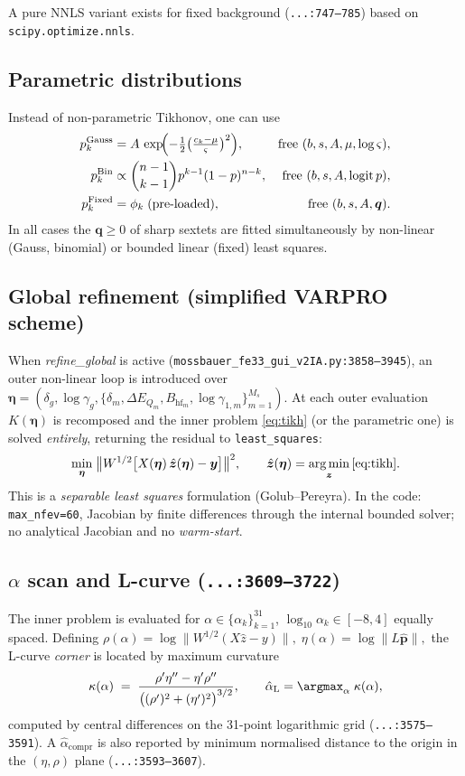 \documentclass[11pt,a4paper]{article}
\newcommand{\BHF}{B_{\mathrm{hf}}}
\newcommand{\dEQ}{\Delta E_{Q}}
\newcommand{\code}[1]{\texttt{\small #1}}
\newcommand{\file}[1]{\textcolor{black!70}{\texttt{\small #1}}}
\DeclareMathOperator*{\argmin}{arg\,min}
\begin{document}
A pure NNLS variant exists for fixed background (\file{...:747--785}) based on \code{scipy.optimize.nnls}.

\subsection{Parametric distributions}\label{sec:param}
Instead of non-parametric Tikhonov, one can use
\begin{align}
  p_k^{\text{Gauss}} &= A\,\exp\!\Bigl(-\tfrac12 \bigl(\tfrac{c_k-\mu}{\varsigma}\bigr)^{2}\Bigr), & \text{free } (b,s,A,\mu,\log\varsigma),\\
  p_k^{\text{Bin}} &\propto \binom{n-1}{k-1} p^{k-1}(1-p)^{n-k},& \text{free } (b,s,A,\text{logit}\,p),\\
  p_k^{\text{Fixed}} &= \phi_k\;\text{(pre-loaded)},& \text{free } (b,s,A,\bm q).
\end{align}
In all cases the $\bm q\ge0$ of sharp sextets are fitted simultaneously by non-linear (Gauss, binomial) or bounded linear (fixed) least squares.

\subsection{Global refinement (simplified VARPRO scheme)}
When \emph{refine\_global} is active (\file{mossbauer\_fe33\_gui\_v2IA.py:3858--3945}), an outer non-linear loop is introduced over $\bm\eta=(\delta_g,\log\gamma_g,\{\delta_m,\dEQ_m,\BHF_m,\log\gamma_{1,m}\}_{m=1}^{M_s})$. At each outer evaluation $K(\bm\eta)$ is recomposed and the inner problem \eqref{eq:tikh} (or the parametric one) is solved \emph{entirely}, returning the residual to \code{least\_squares}:
\begin{equation}
  \min_{\bm\eta}\;\bigl\|W^{1/2}\bigl[X(\bm\eta)\,\hat{\bm z}(\bm\eta) - \bm y\bigr]\bigr\|^{2},
  \qquad
  \hat{\bm z}(\bm\eta)=\argmin_{\bm z}\eqref{eq:tikh}.
  \label{eq:varpro}
\end{equation}
This is a \emph{separable least squares} formulation (Golub--Pereyra). In the code: \code{max\_nfev=60}, Jacobian by finite differences through the internal bounded solver; no analytical Jacobian and no \emph{warm-start}.

\subsection{$\alpha$ scan and L-curve (\file{...:3609--3722})}
The inner problem is evaluated for $\alpha\in\{\alpha_k\}_{k=1}^{31}$, $\log_{10}\alpha_k\in[-8,4]$ equally spaced. Defining
\(
  \rho(\alpha) = \log\|W^{1/2}(X\hat z - y)\|,\;
  \eta(\alpha) = \log\|L\hat{\bm p}\|,
\)
the L-curve \emph{corner} is located by maximum curvature
\begin{equation}
  \kappa(\alpha) \;=\; \frac{\rho'\eta'' - \eta'\rho''}{\bigl((\rho')^{2}+(\eta')^{2}\bigr)^{3/2}},
  \qquad \hat\alpha_{\text{L}}=\argmax_\alpha\;\kappa(\alpha),
  \label{eq:kappa}
\end{equation}
computed by central differences on the 31-point logarithmic grid (\file{...:3575--3591}). A $\hat\alpha_{\text{compr}}$ is also reported by minimum normalised distance to the origin in the $(\eta,\rho)$ plane (\file{...:3593--3607}).
\end{document}
